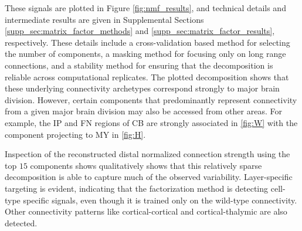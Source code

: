 These signals are plotted in Figure \ref{fig:nmf_results}, and technical details and intermediate results are given in Supplemental Sections \ref{supp_sec:matrix_factor_methods} and \ref{supp_sec:matrix_factor_results}, respectively.
These details include a cross-validation based method for selecting the number of components, a masking method for focusing only on long range connections, and a stability method for ensuring that the decomposition is reliable across computational replicates.
The plotted decomposition shows that these underlying connectivity archetypes correspond strongly to major brain division.
However, certain components that predominantly represent connectivity from a given major brain division may also be accessed from other areas.
For example, the IP and FN regions of CB are strongly associated in \ref{fig:W} with the component projecting to MY in \ref{fig:H}.

Inspection of the reconstructed distal normalized connection strength using the top $15$ components shows qualitatively shows that this relatively sparse decomposition is able to capture much of the observed variability.
Layer-specific targeting is evident, indicating that the factorization method is detecting cell-type specific signals, even though it is trained only on the wild-type connectivity.
Other connectivity patterns like cortical-cortical and cortical-thalymic are also detected.

\newpage

